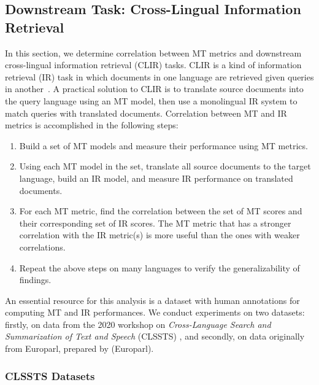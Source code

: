 \subsection{Downstream Task: Cross-Lingual Information Retrieval}
\label{sec:clir}
In this section, we determine correlation between MT metrics and  downstream cross-lingual information retrieval (CLIR) tasks.
CLIR is a kind of information retrieval (IR) task in which documents in one language are retrieved given queries in another~\cite{grefenstette2012CLIR}. 
A practical solution to CLIR is to translate source documents into the query language using an MT model, then use a monolingual IR system to match queries with translated documents. 
Correlation between MT and IR metrics is accomplished in the following steps: 
\begin{enumerate}[noitemsep,topsep=0pt]
 \item Build a set of MT models and measure their performance using MT metrics.
 \item Using each MT model in the set, translate all source documents to the target language, build an IR model, and measure IR performance on translated documents.
 \item For each MT metric, find the correlation between the set of MT scores and their corresponding set of IR scores.
 The MT metric that has a stronger correlation with the IR metric(s) is more useful than the ones with weaker correlations.
\item Repeat the above steps on many languages to verify the generalizability of findings.
\end{enumerate}


An essential resource for this analysis is a dataset with human annotations for computing MT and IR performances.
We conduct experiments on two datasets: firstly, on data from the 2020 workshop on \textit{Cross-Language Search and Summarization of Text and Speech} (CLSSTS) \cite{zavorin-etal-2020-corpora}, and secondly, on data originally from Europarl, prepared by \citet{lignos-etal-2019-MT-IR} (Europarl).

\subsubsection{CLSSTS Datasets}
\label{sec:material}

